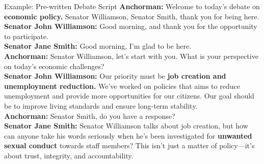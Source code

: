 \documentclass[9pt, aspectratio=169]{beamer}
\begin{document}
\begin{frame}{Example: Pre-written Debate Script}
\small
\textbf{Anchorman:} Welcome to today’s debate on \textbf{economic policy.} Senator Williamson, Senator Smith, thank you for being here. \\
\vspace{0.2cm}
\textbf{Senator John Williamson:} Good morning, and thank you for the opportunity to participate.\\
\vspace{0.2cm}
\textbf{Senator Jane Smith:} Good morning, I’m glad to be here.\\
\vspace{0.2cm}
\textbf{Anchorman:} Senator Williamson, let’s start with you. What is your perspective on today’s economic challenges?\\
\vspace{0.2cm}
\textbf{Senator John Williamson:} Our priority must be \textbf{job creation and unemployment reduction.} We’ve worked on policies that aims to reduce unemployment and provide more opportunities for our citizens. Our goal should be to improve living standards and ensure long-term stability.\\
\vspace{0.2cm}
\textbf{Anchorman:} Senator Smith, do you have a response? \\
\vspace{0.2cm}
\textbf{Senator Jane Smith:} Senator Williamson talks about job creation, but how can anyone take his words seriously when he’s been investigated for \textbf{unwanted sexual conduct} towards staff members? This isn’t just a matter of policy—it’s about trust, integrity, and accountability.
\end{frame}
\end{document}
